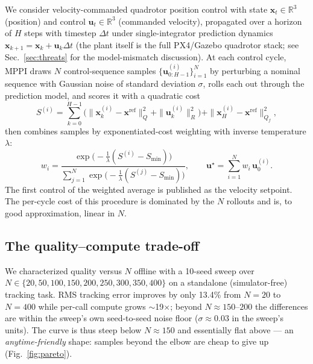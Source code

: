 \documentclass[conference]{IEEEtran}
\begin{document}
We consider velocity-commanded quadrotor position control with state
$\mathbf{x}_t \in \mathbb{R}^3$ (position) and control
$\mathbf{u}_t \in \mathbb{R}^3$ (commanded velocity), propagated over a
horizon of $H$ steps with timestep $\Delta t$ under single-integrator
prediction dynamics $\mathbf{x}_{k+1} = \mathbf{x}_k + \mathbf{u}_k
\Delta t$ (the plant itself is the full PX4/Gazebo quadrotor stack; see
Sec.~\ref{sec:threats} for the model-mismatch discussion). At each control
cycle, MPPI draws $N$ control-sequence samples
$\{\mathbf{u}^{(i)}_{0:H-1}\}_{i=1}^{N}$ by perturbing a nominal sequence
with Gaussian noise of standard deviation $\sigma$, rolls each out through
the prediction model, and scores it with a quadratic cost
\begin{equation}
S^{(i)} = \sum_{k=0}^{H-1} \Big( \|\mathbf{x}^{(i)}_k -
\mathbf{x}^{\mathrm{ref}}\|^2_{Q} + \|\mathbf{u}^{(i)}_k\|^2_{R} \Big)
 + \|\mathbf{x}^{(i)}_H - \mathbf{x}^{\mathrm{ref}}\|^2_{Q_f},
\end{equation}
then combines samples by exponentiated-cost weighting with inverse
temperature $\lambda$:
\begin{equation}
w_i = \frac{\exp\!\big(-\tfrac{1}{\lambda}(S^{(i)} - S_{\min})\big)}
{\sum_{j=1}^{N}\exp\!\big(-\tfrac{1}{\lambda}(S^{(j)} - S_{\min})\big)},
\qquad
\mathbf{u}^\star = \sum_{i=1}^{N} w_i\, \mathbf{u}^{(i)}_{0}.
\end{equation}
The first control of the weighted average is published as the velocity
setpoint. The per-cycle cost of this procedure is dominated by the $N$
rollouts and is, to good approximation, linear in $N$.

\subsection{The quality--compute trade-off}
\label{sec:pareto}

We characterized quality versus $N$ offline with a 10-seed sweep over
$N \in \{20, 50, 100, 150, 200, 250, 300, 350, 400\}$ on a standalone
(simulator-free) tracking task. RMS tracking error improves by only
13.4\% from $N{=}20$ to $N{=}400$ while per-call compute grows
$\sim$19$\times$; beyond $N \approx 150$--$200$ the differences are
within the sweep's own seed-to-seed noise floor
($\sigma \approx 0.03$ in the sweep's units). The curve is thus steep
below $N \approx 150$ and essentially flat above --- an
\emph{anytime-friendly} shape: samples beyond the elbow are cheap to
give up (Fig.~\ref{fig:pareto}).
\end{document}
